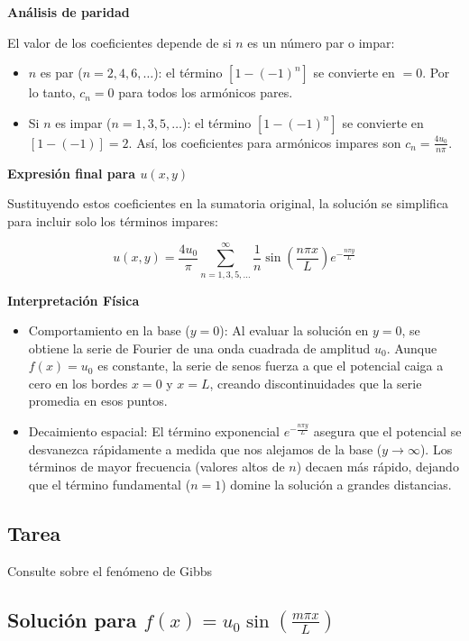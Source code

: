 \documentclass[a4paper]{article}
\begin{document}
\textbf{Análisis de paridad}

El valor de los coeficientes depende de si $n$ es un número par o impar:

\begin{itemize}
	\item $n$ es par ($n = 2, 4, 6, \dots$): el término $[1 - (-1)^n]$ se convierte en $ = 0$. Por lo tanto, $c_n = 0$ para todos los armónicos pares.
	\item Si $n$ es impar ($n = 1, 3, 5, \dots$): el término $[1 - (-1)^n]$ se convierte en $[1 - (-1)] = 2$. Así, los coeficientes para armónicos impares son $c_n = \frac{4u_0}{n\pi}$.
\end{itemize}

\textbf{Expresión final para $u(x, y)$}

Sustituyendo estos coeficientes en la sumatoria original, la solución se simplifica para incluir solo los términos impares:

$$u(x, y) = \frac{4u_0}{\pi} \sum_{n=1,3,5,\dots}^{\infty} \frac{1}{n} \sin\left(\frac{n\pi x}{L}\right) e^{-\frac{n\pi y}{L}}$$

\textbf{Interpretación Física}
\begin{itemize}
	\item Comportamiento en la base ($y=0$): Al evaluar la solución en $y=0$, se obtiene la serie de Fourier de una onda cuadrada de amplitud $u_0$. Aunque $f(x)=u_0$ es constante, la serie de senos fuerza a que el potencial caiga a cero en los bordes $x=0$ y $x=L$, creando discontinuidades que la serie promedia en esos puntos.
	\item Decaimiento espacial: El término exponencial $e^{-\frac{n\pi y}{L}}$ asegura que el potencial se desvanezca rápidamente a medida que nos alejamos de la base ($y \to \infty$). Los términos de mayor frecuencia (valores altos de $n$) decaen más rápido, dejando que el término fundamental ($n=1$) domine la solución a grandes distancias.
\end{itemize}

\subsection{Tarea} 

Consulte sobre el fenómeno de Gibbs

\subsection{Solución para $f(x) = u_0\sin\left(\frac{m\pi x}{L}\right)$}
\end{document}
